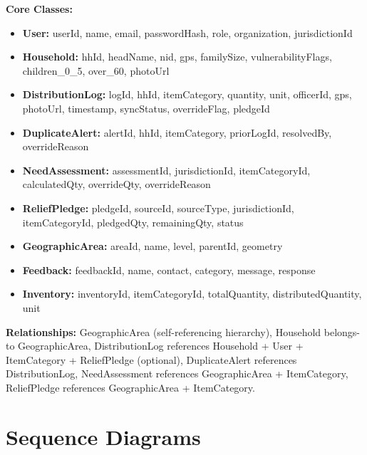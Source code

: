 \textbf{Core Classes:}
\begin{itemize}[nosep]
    \item \textbf{User:} userId, name, email, passwordHash, role, organization, jurisdictionId
    \item \textbf{Household:} hhId, headName, nid, gps, familySize, vulnerabilityFlags, children\_0\_5, over\_60, photoUrl
    \item \textbf{DistributionLog:} logId, hhId, itemCategory, quantity, unit, officerId, gps, photoUrl, timestamp, syncStatus, overrideFlag, pledgeId
    \item \textbf{DuplicateAlert:} alertId, hhId, itemCategory, priorLogId, resolvedBy, overrideReason
    \item \textbf{NeedAssessment:} assessmentId, jurisdictionId, itemCategoryId, calculatedQty, overrideQty, overrideReason
    \item \textbf{ReliefPledge:} pledgeId, sourceId, sourceType, jurisdictionId, itemCategoryId, pledgedQty, remainingQty, status
    \item \textbf{GeographicArea:} areaId, name, level, parentId, geometry
    \item \textbf{Feedback:} feedbackId, name, contact, category, message, response
    \item \textbf{Inventory:} inventoryId, itemCategoryId, totalQuantity, distributedQuantity, unit
\end{itemize}

\textbf{Relationships:} GeographicArea (self-referencing hierarchy), Household belongs-to GeographicArea, DistributionLog references Household + User + ItemCategory + ReliefPledge (optional), DuplicateAlert references DistributionLog, NeedAssessment references GeographicArea + ItemCategory, ReliefPledge references GeographicArea + ItemCategory.

\section{Sequence Diagrams}

